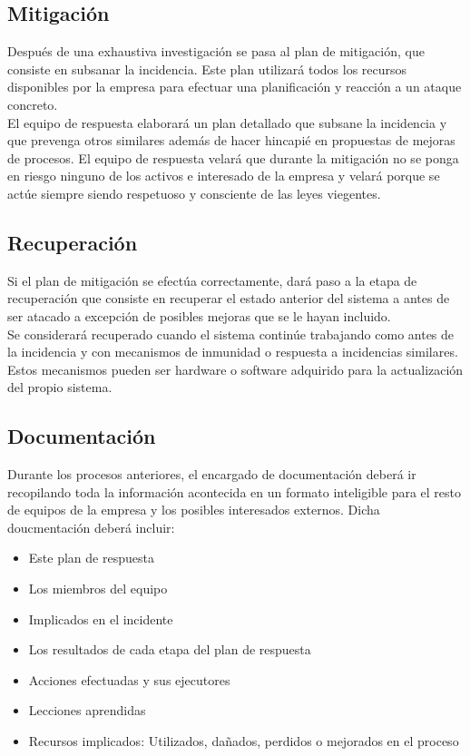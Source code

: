 \documentclass[10pt,a4paper]{article}
\begin{document}
\begin{enumerate}
\subsection{Mitigación}
Después de una exhaustiva investigación se pasa al plan de mitigación, que consiste en subsanar la incidencia. Este plan utilizará todos los recursos disponibles por la empresa para efectuar una planificación y reacción a un ataque concreto.\\
El equipo de respuesta elaborará un plan detallado que subsane la incidencia y que prevenga otros similares además de hacer hincapié en propuestas de mejoras de procesos. 
El equipo de respuesta velará que durante la mitigación no se ponga en riesgo ninguno de los activos e interesado de la empresa y velará porque se actúe siempre siendo respetuoso y consciente de las leyes viegentes.
\subsection{Recuperación}
Si el plan de mitigación se efectúa correctamente, dará paso a la etapa de recuperación que consiste en recuperar el estado anterior del sistema a antes de ser atacado a excepción de posibles mejoras que se le hayan incluido.\\
Se considerará recuperado cuando el sistema continúe trabajando como antes de la incidencia y con mecanismos de inmunidad o respuesta a incidencias similares. Estos mecanismos pueden ser hardware o software adquirido para la actualización del propio sistema.
\subsection{Documentación}
Durante los procesos anteriores, el encargado de documentación deberá ir recopilando toda la información acontecida en un formato inteligible para el resto de equipos de la empresa y los posibles interesados externos. Dicha doucmentación deberá incluir:
\begin{itemize}
\item Este plan de respuesta
\item Los miembros del equipo
\item Implicados en el incidente
\item Los resultados de cada etapa del plan de respuesta
\item Acciones efectuadas y sus ejecutores
\item Lecciones aprendidas
\item Recursos implicados: Utilizados, dañados, perdidos o mejorados en el proceso
\end{itemize}

\end{enumerate}
\end{document}
